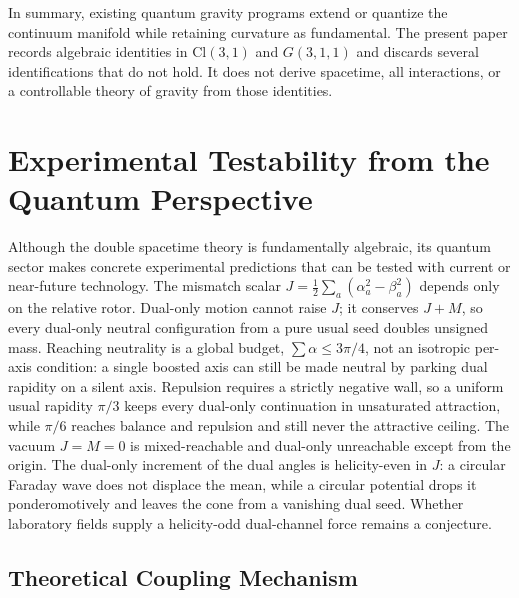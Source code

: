 \documentclass[a4paper]{article}
\begin{document}
In summary, existing quantum gravity programs extend or quantize the continuum manifold while retaining curvature as fundamental. The present paper records algebraic identities in $\mathrm{Cl}(3,1)$ and $G(3,1,1)$ and discards several identifications that do not hold. It does not derive spacetime, all interactions, or a controllable theory of gravity from those identities.

\section{Experimental Testability from the Quantum Perspective}
\label{sec:experiments}

Although the double spacetime theory is fundamentally algebraic, its quantum sector makes concrete experimental predictions that can be tested with current or near-future technology. The mismatch scalar $J=\tfrac12\sum_a(\alpha_a^2-\beta_a^2)$ depends only on the relative rotor. Dual-only motion cannot raise $J$; it conserves $J+M$, so every dual-only neutral configuration from a pure usual seed doubles unsigned mass. Reaching neutrality is a global budget, $\sum\alpha\le 3\pi/4$, not an isotropic per-axis condition: a single boosted axis can still be made neutral by parking dual rapidity on a silent axis. Repulsion requires a strictly negative wall, so a uniform usual rapidity \(\pi/3\) keeps every dual-only continuation in unsaturated attraction, while \(\pi/6\) reaches balance and repulsion and still never the attractive ceiling. The vacuum $J=M=0$ is mixed-reachable and dual-only unreachable except from the origin. The dual-only increment of the dual angles is helicity-even in $J$: a circular Faraday wave does not displace the mean, while a circular potential drops it ponderomotively and leaves the cone from a vanishing dual seed. Whether laboratory fields supply a helicity-odd dual-channel force remains a conjecture.

\subsection{Theoretical Coupling Mechanism}
\end{document}
